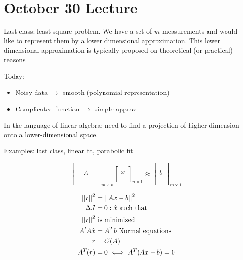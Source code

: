 \section{October 30 Lecture}
Last class: least square problem. We have a set of $m$ measurements and would like to represent them by a lower dimensional approximation.
This lower dimensional approximation is typically proposed on theoretical (or practical) reasons

Today:
\begin{itemize}
  \item Noisy data $\longrightarrow$ smooth (polynomial representation)
  \item Complicated function $\longrightarrow$ simple approx.
\end{itemize}

In the language of linear algebra: need to find a projection of higher dimension onto a lower-dimensional space.

Examples: last class, linear fit, parabolic fit

\[
  \begin{bmatrix}
    &  &  \\
    &  &  \\
    & A &  \\
    &  &  \\
    &  &  \\
  \end{bmatrix}_{m \times n}
  \begin{bmatrix}
     \\ x \\ \\
  \end{bmatrix}_{n \times 1}
  \approx
  \begin{bmatrix}
    \\ \\ b \\ \\ \\
  \end{bmatrix}_{m \times 1}
\]

\begin{align*}
  \left|\left|r\right|\right|^2 &= \left|\left|Ax - b\right|\right|^2\\
  \Delta J &= 0 : \hat{x} \text{ such that}\\
  \left|\left|r\right|\right|^2 &\text{ is minimized} \\
  A^tA\hat{x} &= A^T b \text{ Normal equations}\\
  r &\perp C(A) \\
  A^T(r) &= 0 \iff A^T(Ax-b) = 0
\end{align*}

